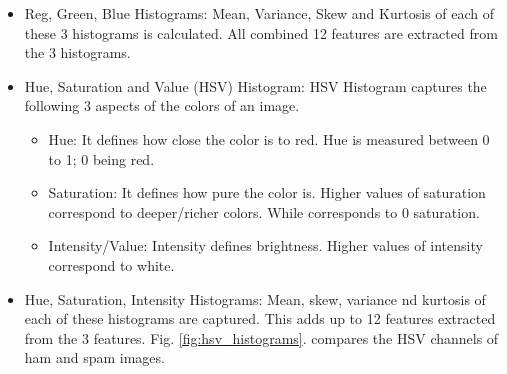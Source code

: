 \begin{itemize}
\begin{itemize}
	
		\item Reg, Green, Blue Histograms: Mean, Variance, Skew and Kurtosis of each of these 3 histograms is calculated. All combined 12 features are extracted from the 3 histograms. 
		\item Hue, Saturation and Value (HSV) Histogram: HSV Histogram captures the following 3 aspects of the colors of  an image. 
		\begin{itemize}
			\item Hue: It defines how close the color is to red. Hue is measured between 0 to 1; 0 being red.
			\item Saturation: It defines how pure the color is. Higher values of saturation correspond to deeper/richer colors. While corresponds to 0 saturation.
			\item Intensity/Value: Intensity defines brightness. Higher values of intensity correspond to white.
		\end{itemize}
		\item Hue, Saturation, Intensity Histograms: Mean, skew, variance nd kurtosis of each of these histograms are captured. This adds up to 12 features extracted from the 3 features.  Fig. \ref{fig:hsv_histograms}. compares the HSV channels of ham and spam images.
		
		\begin{figure}[h]
			

\end{figure}
\end{itemize}
\end{itemize}
